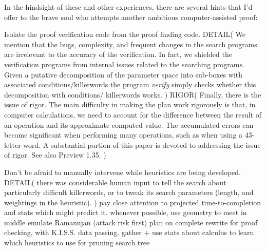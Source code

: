 In the hindsight of these and other experiences, there are several hints that I'd offer to the brave soul who attempts another ambitious computer-assisted proof:
\begin{itemize}
   Isolate the proof verification code from the proof finding code.
DETAIL(
We mention that the bugs, complexity, and 
frequent changes in the search programs are irrelevant to the 
accuracy of the verification.  In fact, we shielded the verification 
programs from internal issues related to the searching programs.  
Given a putative decomposition of the parameter space into 
sub-boxes with associated conditions/killerwords the program {\it verify} 
simply checks whether this decomposition with conditions/ 
killerwords works. 
)
RIGOR(
Finally, there is the issue of rigor.
The main difficulty in making the plan work rigorously is that, in computer calculations, we need to account for the difference
between the result of an operation and its approximate computed value.
The accumulated errors can become significant when performing
many operations, such as when using a 43-letter 
word.  A substantial portion of this paper is devoted to addressing
the  issue of rigor.  See also Preview 1.35.
)

   Don't be afraid to manually intervene while heuristics are being developed.
DETAIL(
there was considerable human input 
to tell the search about particularly difficult killerwords, or to tweak 
its search parameters (length, and weightings in the heuristic).
)
   pay close attention to projected time-to-completion and stats which might predict it.
   whenever possible, use geometry to meet in middle
   emulate Ramanujan (attack risk first)
   plan on complete rewrite for proof checking, with K.I.S.S. data passing.
   gather + use stats about calculus to learn which heuristics to use for pruning search tree
\end{itemize}

